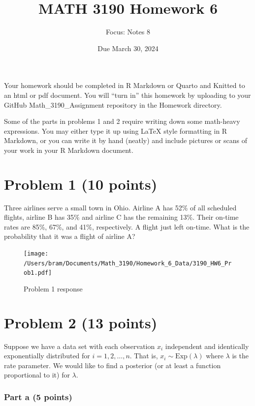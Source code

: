 \documentclass[
]{article}
\title{MATH 3190 Homework 6}
\author{Focus: Notes 8}
\date{Due March 30, 2024}
\begin{document}
\maketitle

Your homework should be completed in R Markdown or Quarto and Knitted to
an html or pdf document. You will ``turn in'' this homework by uploading
to your GitHub Math\_3190\_Assignment repository in the Homework
directory.

Some of the parts in problems 1 and 2 require writing down some
math-heavy expressions. You may either type it up using LaTeX style
formatting in R Markdown, or you can write it by hand (neatly) and
include pictures or scans of your work in your R Markdown document.

\hypertarget{problem-1-10-points}{%
\section{Problem 1 (10 points)}\label{problem-1-10-points}}

Three airlines serve a small town in Ohio. Airline A has 52\% of all
scheduled flights, airline B has 35\% and airline C has the remaining
13\%. Their on-time rates are 85\%, 67\%, and 41\%, respectively. A
flight just left on-time. What is the probability that it was a flight
of airline A?

\begin{figure}
\hypertarget{id}{%
\centering
\texttt{[image: /Users/bram/Documents/Math\_3190/Homework\_6\_Data/3190\_HW6\_Prob1.pdf]}
\caption{Problem 1 response}\label{id}
}
\end{figure}

\hypertarget{problem-2-13-points}{%
\section{Problem 2 (13 points)}\label{problem-2-13-points}}

Suppose we have a data set with each observation \(x_i\) independent and
identically exponentially distributed for \(i=1,2,\dots,n\). That is,
\(x_i\sim \text{Exp}(\lambda)\) where \(\lambda\) is the rate parameter.
We would like to find a posterior (or at least a function proportional
to it) for \(\lambda\).

\hypertarget{part-a-5-points}{%
\subsubsection{Part a (5 points)}\label{part-a-5-points}}
\end{document}
